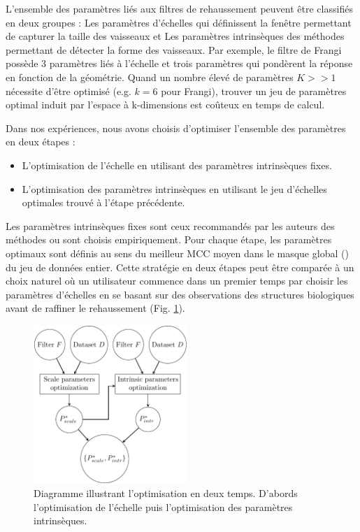 L'ensemble des paramètres liés aux filtres de rehaussement peuvent être classifiés en deux groupes : Les paramètres d'échelles qui définissent la fenêtre permettant de capturer la taille des vaisseaux et Les paramètres intrinsèques des méthodes permettant de détecter la forme des vaisseaux. Par exemple, le filtre de Frangi possède 3 paramètres liés à l'échelle et trois paramètres qui pondèrent la réponse en fonction de la géométrie. Quand un nombre élevé de paramètres $K >> 1$ nécessite d'être optimisé (e.g. $k=6$ pour Frangi), trouver un jeu de paramètres optimal induit par l'espace à k-dimensions est coûteux en temps de calcul.

Dans nos expériences, nous avons choisis d'optimiser l'ensemble des paramètres en deux étapes :

\begin{itemize}
\item L'optimisation de l'échelle en utilisant des paramètres intrinsèques fixes.
\item L'optimisation des paramètres intrinsèques en utilisant le jeu d'échelles optimales trouvé à l'étape précédente.
\end{itemize}

Les paramètres intrinsèques fixes sont ceux recommandés par les auteurs des méthodes ou sont choisis empiriquement.  Pour chaque étape, les paramètres optimaux sont définis au sens du meilleur MCC moyen dans le masque global (\maskglobal) du jeu de données entier. Cette stratégie en deux étapes peut être comparée à un choix naturel où un utilisateur commence dans un premier temps par choisir les paramètres d'échelles en se basant sur des observations des structures biologiques avant de raffiner le rehaussement (Fig. \ref{fig:flowchart_opti}).

\begin{figure}[!ht]
  \centering
  \includegraphics[height=6cm]{Images/flowchart_benchmark.pdf}
  \caption{Diagramme illustrant l'optimisation en deux temps. D'abords l'optimisation de l'échelle puis l'optimisation des paramètres intrinsèques.}
  \label{fig:flowchart_opti}
\end{figure}


